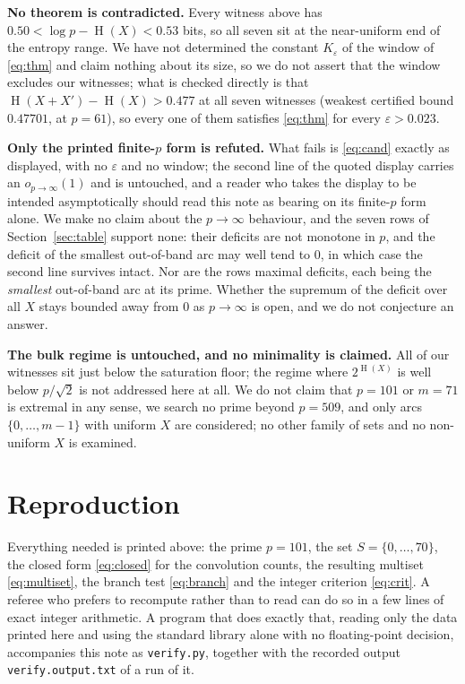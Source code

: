 \documentclass[11pt]{amsart}
\theoremstyle{remark}
\DeclareMathOperator{\Ent}{H}
\begin{document}
\noindent\textbf{No theorem is contradicted.}  Every witness above has
$0.50<\log p-\Ent(X)<0.53$ bits, so all seven sit at the near-uniform end of
the entropy range.  We have not determined the constant $K_\varepsilon$ of the
window of \eqref{eq:thm} and claim nothing about its size, so we do not assert
that the window excludes our witnesses; what is checked directly is that
$\Ent(X+X')-\Ent(X)>0.477$ at all seven witnesses (weakest certified bound
$0.47701$, at $p=61$), so every one of them satisfies \eqref{eq:thm} for every
$\varepsilon>0.023$.

\medskip
\noindent\textbf{Only the printed finite-$p$ form is refuted.}  What fails is
\eqref{eq:cand} exactly as displayed, with no $\varepsilon$ and no window; the
second line of the quoted display carries an $o_{p\to\infty}(1)$ and is
untouched, and a reader who takes the display to be intended asymptotically
should read this note as bearing on its finite-$p$ form alone.  We make no
claim about the $p\to\infty$ behaviour, and the seven rows of
Section~\ref{sec:table} support
none: their deficits are not monotone in $p$, and the deficit of the smallest
out-of-band arc may well tend to $0$, in which case the second line survives
intact.  Nor are the rows maximal deficits, each being the \emph{smallest}
out-of-band arc at its prime.  Whether the supremum of the deficit over all
$X$ stays bounded away from $0$ as $p\to\infty$ is open, and we do not
conjecture an answer.

\medskip
\noindent\textbf{The bulk regime is untouched, and no minimality is claimed.}
All of our witnesses sit just below the saturation floor; the regime where
$2^{\Ent(X)}$ is well below $p/\sqrt2$ is not addressed here at all.  We do
not claim that $p=101$ or $m=71$ is extremal in any sense, we search no prime
beyond $p=509$, and only arcs $\{0,\dots,m-1\}$ with uniform $X$ are
considered; no other family of sets and no non-uniform $X$ is examined.



\section{Reproduction}

Everything needed is printed above: the prime $p=101$, the set
$S=\{0,\dots,70\}$, the closed form \eqref{eq:closed} for the convolution
counts, the resulting multiset \eqref{eq:multiset}, the branch test
\eqref{eq:branch} and the integer criterion \eqref{eq:crit}.  A referee who
prefers to recompute rather than to read can do so in a few lines of exact
integer arithmetic.  A program that does exactly that, reading only the data
printed here and using the standard library alone with no floating-point
decision, accompanies this note as \texttt{verify.py}, together with the
recorded output \texttt{verify.output.txt} of a run of it.
\end{document}
